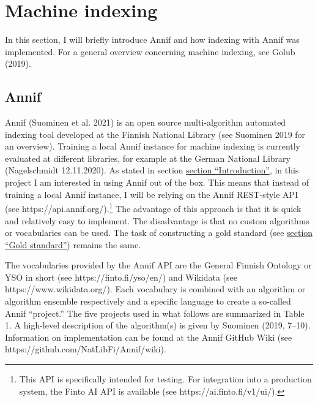 \hypertarget{machine-indexing}{%
\section{Machine indexing}\label{machine-indexing}}

In this section, I will briefly introduce Annif and how indexing with
Annif was implemented. For a general overview concerning machine
indexing, see Golub (2019).

\hypertarget{annif}{%
\subsection{Annif}\label{annif}}

Annif (Suominen et al. 2021) is an open source multi-algorithm automated
indexing tool developed at the Finnish National Library (see Suominen
2019 for an overview). Training a local Annif instance for machine
indexing is currently evaluated at different libraries, for example at
the German National Library (Nagelschmidt 12.11.2020). As stated in
section \protect\hyperlink{introduction}{section ``Introduction''}, in
this project I am interested in using Annif out of the box. This means
that instead of training a local Annif instance, I will be relying on
the Annif REST-style API (see https://api.annif.org/).\footnote{This API
  is specifically intended for testing. For integration into a
  production system, the Finto AI API is available (see
  https://ai.finto.fi/v1/ui/).} The advantage of this approach is that
it is quick and relatively easy to implement. The disadvantage is that
no custom algorithms or vocabularies can be used. The task of
constructing a gold standard (see
\protect\hyperlink{gold-standard}{section ``Gold standard''}) remains
the same.

The vocabularies provided by the Annif API are the General Finnish
Ontology or YSO in short (see https://finto.fi/yso/en/) and Wikidata
(see https://www.wikidata.org/). Each vocabulary is combined with an
algorithm or algorithm ensemble respectively and a specific language to
create a so-called Annif ``project.'' The five projects used in what
follows are summarized in Table 1. A high-level description of the
algorithm(s) is given by Suominen (2019, 7--10). Information on
implementation can be found at the Annif GitHub Wiki (see
https://github.com/NatLibFi/Annif/wiki).

